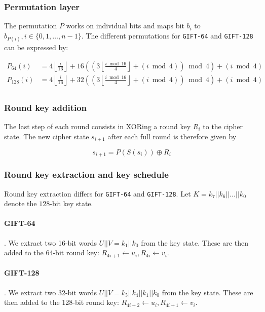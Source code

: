 \subsubsection{Permutation layer}

The permutation $P$ works on individual bits and maps bit $b_i$ to $b_{P(i)},
i\in\{0,1,\dots,n-1\}$. The different permutations for \texttt{GIFT-64} and
\texttt{GIFT-128} can be expressed by:

\begin{align*}
    P_{64}(i)&=4\left\lfloor\frac{i}{16}\right\rfloor+16\left(\left(3\left\lfloor\frac{i\bmod 16}{4}\right\rfloor+(i\bmod 4)\right)\bmod 4\right)+(i\bmod 4) \\
    P_{128}(i)&=4\left\lfloor\frac{i}{16}\right\rfloor+32\left(\left(3\left\lfloor\frac{i\bmod 16}{4}\right\rfloor+(i\bmod 4)\right)\bmod 4\right)+(i\bmod 4) \\
\end{align*}

\subsubsection{Round key addition}

The last step of each round consists in XORing a round key $R_i$ to the cipher
state. The new cipher state $s_{i+1}$ after each full round is therefore given
by

\[
    s_{i+1}=P(S(s_i))\oplus R_i
\]

\subsubsection{Round key extraction and key schedule}

Round key extraction differs for \texttt{GIFT-64} and \texttt{GIFT-128}. Let
$K=k_7||k_6||\dots||k_0$ denote the $128$-bit key state.

\paragraph{GIFT-64}. We extract two 16-bit words $U||V=k_1||k_0$ from the key
state. These are then added to the 64-bit round key: $R_{4i+1}\leftarrow
u_i,R_{4i}\leftarrow v_i$.

\paragraph{GIFT-128}. We extract two 32-bit words $U||V=k_5||k_4||k_1||k_0$ from
the key state. These are then added to the 128-bit round key: $R_{4i+2}\leftarrow
u_i,R_{4i+1}\leftarrow v_i$.

